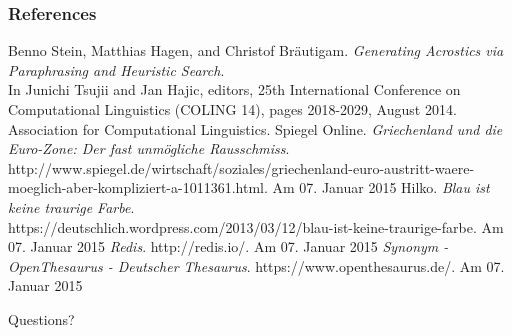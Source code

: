 \documentclass{beamer}
\begin{document}
\begin{frame}
\frametitle{References}
\scriptsize
\begin{thebibliography}{1}
	Benno Stein, Matthias Hagen, and Christof Bräutigam. \emph{Generating Acrostics via Paraphrasing and Heuristic Search}. \\
	In Junichi Tsujii and Jan Hajic, editors, 25th International Conference on Computational Linguistics (COLING 14), pages 2018-2029, August 2014. Association for Computational Linguistics.
	Spiegel Online. \emph{Griechenland und die Euro-Zone: Der fast unmögliche Rausschmiss}. \\
	http://www.spiegel.de/wirtschaft/soziales/griechenland-euro-austritt-waere-moeglich-aber-kompliziert-a-1011361.html. Am 07. Januar 2015
	Hilko. \emph{Blau ist keine traurige Farbe}. \\
	https://deutschlich.wordpress.com/2013/03/12/blau-ist-keine-traurige-farbe. Am 07. Januar 2015
	\emph{Redis}. http://redis.io/. Am 07. Januar 2015
	\emph{Synonym - OpenThesaurus - Deutscher Thesaurus}. https://www.openthesaurus.de/. Am 07. Januar 2015
\end{thebibliography}
\end{frame}

\begin{frame}
\Huge{\centerline{Questions?}}
\end{frame}

\end{document}
